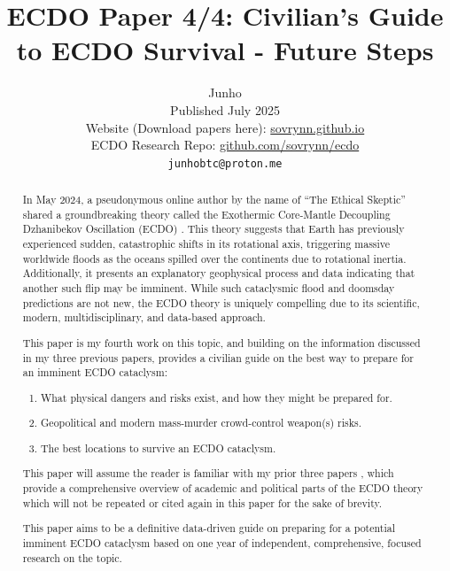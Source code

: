 \documentclass[10pt,twocolumn,letterpaper]{article}
\begin{document}
\title{ECDO Paper 4/4: Civilian's Guide to ECDO Survival - Future Steps}

\author{Junho\\
Published July 2025\\
Website (Download papers here): \href{https://sovrynn.github.io}{sovrynn.github.io}\\
ECDO Research Repo: \href{https://github.com/sovrynn/ecdo}{github.com/sovrynn/ecdo}\\
{\tt\small junhobtc@proton.me}
}

\maketitle

\begin{abstract}
In May 2024, a pseudonymous online author by the name of “The Ethical Skeptic” \cite{0} shared a groundbreaking theory called the Exothermic Core-Mantle Decoupling Dzhanibekov Oscillation (ECDO) \cite{1}. This theory suggests that Earth has previously experienced sudden, catastrophic shifts in its rotational axis, triggering massive worldwide floods as the oceans spilled over the continents due to rotational inertia. Additionally, it presents an explanatory geophysical process and data indicating that another such flip may be imminent. While such cataclysmic flood and doomsday predictions are not new, the ECDO theory is uniquely compelling due to its scientific, modern, multidisciplinary, and data-based approach.

This paper is my fourth work \cite{2,3} on this topic, and building on the information discussed in my three previous papers, provides a civilian guide on the best way to prepare for an imminent ECDO cataclysm:
\begin{flushleft}
\begin{enumerate}
    \item What physical dangers and risks exist, and how they might be prepared for.
    \item Geopolitical and modern mass-murder crowd-control weapon(s) risks.
    \item The best locations to survive an ECDO cataclysm.
\end{enumerate}
\end{flushleft}

This paper will assume the reader is familiar with my prior three papers \cite{3}, which provide a comprehensive overview of academic and political parts of the ECDO theory which will not be repeated or cited again in this paper for the sake of brevity.

This paper aims to be a definitive data-driven guide on preparing for a potential imminent ECDO cataclysm based on one year of independent, comprehensive, focused research on the topic.
\end{abstract}
\end{document}
